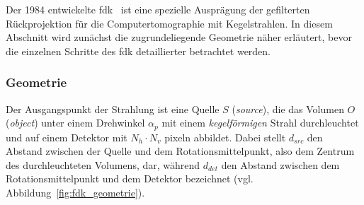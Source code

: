 Der 1984 entwickelte \gls{fdk}~\cite{fdk} ist eine spezielle Ausprägung der gefilterten Rückprojektion für die
Computertomographie mit Kegelstrahlen. In diesem Abschnitt wird zunächst die zugrundeliegende Geometrie näher erläutert,
bevor die einzelnen Schritte des \gls{fdk} detaillierter betrachtet werden.

\subsubsection{Geometrie}\label{sssec:fdk_geometrie}

 Der Ausgangspunkt der Strahlung ist eine Quelle $S$ (\textit{source}), die das
Volumen $O$ (\textit{object}) unter einem Drehwinkel $\alpha_p$ mit einem \textit{kegelförmigen} Strahl durchleuchtet
und auf einem Detektor mit $N_h \cdot N_v$ \gls{pixel}n abbildet. Dabei stellt $d_{src}$ den Abstand zwischen der Quelle
und dem Rotationsmittelpunkt, also dem Zentrum des durchleuchteten Volumens, dar, während $d_{det}$ den Abstand zwischen
dem Rotationsmittelpunkt und dem Detektor bezeichnet (vgl. Abbildung~\ref{fig:fdk_geometrie}).

